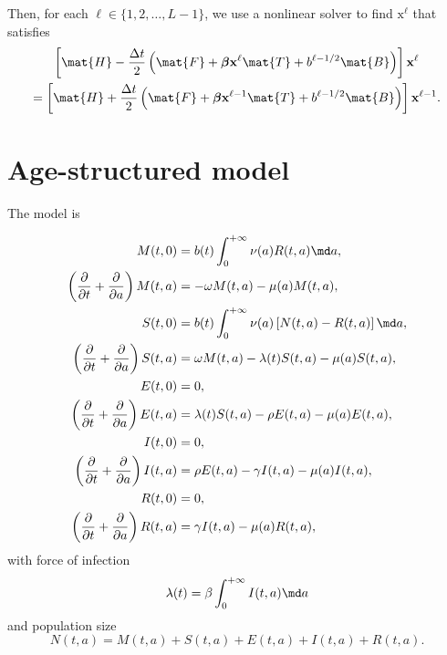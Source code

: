 \documentclass{jpmarticle}
\renewcommand{\vec}[1]{\boldsymbol{\mathrm{#1}}}
\let\subequationsorig\subequations%
\let\endsubequationsorig\endsubequations%
\renewenvironment{subequations}{
  \subequationsorig
  \renewcommand{\theequation}{\theparentequation.\arabic{equation}}
}{
  \endsubequationsorig
}
\begin{document}
Then, for each $\ell \in \{1, 2, \ldots, L - 1\}$,
we use a nonlinear solver to find $\vec{x}^{\ell}$ that satisfies
\begin{multline}
  \left[
    \mat{H}
    - \frac{\Delta t}{2}
    \left(
      \mat{F}
      + \vec{\beta} \vec{x}^{\ell} \mat{T}
      + b^{\ell - 1 / 2} \mat{B}
    \right)
  \right]
  \vec{x}^{\ell}
  \\
  =
  \left[
    \mat{H}
    + \frac{\Delta t}{2}
    \left(
      \mat{F}
      + \vec{\beta} \vec{x}^{\ell - 1} \mat{T}
      + b^{\ell - 1 / 2} \mat{B}
    \right)
  \right]
  \vec{x}^{\ell - 1}.
\end{multline}


\section{Age-structured model}

The model is
\begin{subequations}
  \label{model_age_structured}
  \begin{align}
    M(t, 0)
    &= b(t) \int_0^{+\infty} \nu(a) R(t, a) \md a,
    \\
    \left(\frac{\partial}{\partial t}
      + \frac{\partial}{\partial a}\right)
    M(t, a)
    &= - \omega M(t, a) - \mu(a) M(t, a),
    \\
    S(t, 0)
    &= b(t) \int_0^{+\infty} \nu(a) \left[N(t, a) - R(t, a)\right] \md a,
    \\
    \left(\frac{\partial}{\partial t}
      + \frac{\partial}{\partial a}\right)
    S(t, a)
    &= \omega M(t, a) - \lambda(t) S(t, a) - \mu(a) S(t, a),
    \\
    E(t, 0)
    &= 0,
    \\
    \left(\frac{\partial}{\partial t}
      + \frac{\partial}{\partial a}\right)
    E(t, a)
    &= \lambda(t) S(t, a) - \rho E(t, a) - \mu(a) E(t, a),
    \\
    I(t, 0)
    &= 0,
    \\
    \left(\frac{\partial}{\partial t}
      + \frac{\partial}{\partial a}\right)
    I(t, a)
    &= \rho E(t, a) - \gamma I(t, a) - \mu(a) I(t, a),
    \\
    R(t, 0)
    &= 0,
    \\
    \left(\frac{\partial}{\partial t}
      + \frac{\partial}{\partial a}\right)
    R(t, a)
    &= \gamma I(t, a) - \mu(a) R(t, a),
  \end{align}
  with force of infection
  \begin{equation}
    \lambda(t) = \beta \int_0^{+\infty} I(t, a) \md a
  \end{equation}
  and population size
  \begin{equation}
    N(t, a) = M(t, a) + S(t, a) + E(t, a) + I(t, a) + R(t, a).
  \end{equation}
\end{subequations}
\end{document}
